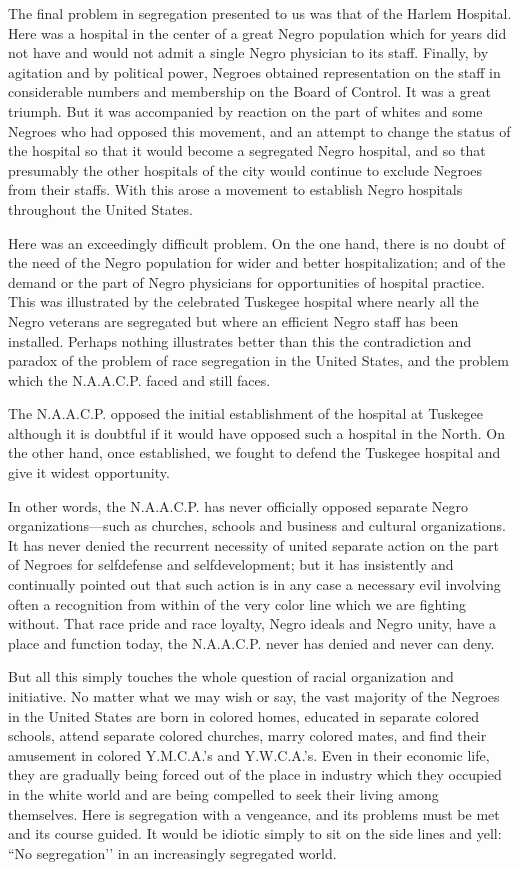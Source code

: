\documentclass[letterpaper,10pt,english]{jupyterBook}
\begin{document}
\sphinxAtStartPar
The final problem in segregation presented to us was that of the Harlem Hospital. Here was a hospital in the center of a great Negro population which for years did not have and would not admit a single Negro physician to its staff. Finally, by agitation and by political power, Negroes obtained representation on the staff in considerable numbers and membership on the Board of Control. It was a great triumph. But it was accompanied by reaction on the part of whites and some Negroes who had opposed this movement, and an attempt to change the status of the hospital so that it would become a segregated Negro hospital, and so that presumably the other hospitals of the city would continue to exclude Negroes from their staffs. With this arose a movement to establish Negro hospitals throughout the United States.

\sphinxAtStartPar
Here was an exceedingly difficult problem. On the one hand, there is no doubt of the need of the Negro population for wider and better hospitalization; and of the demand or the part of Negro physicians for opportunities of hospital practice. This was illustrated by the celebrated Tuskegee hospital where nearly all the Negro veterans are segregated but where an efficient Negro staff has been installed. Perhaps nothing illustrates better than this the contradiction and paradox of the problem of race segregation in the United States, and the problem which the N.A.A.C.P. faced and still faces.

\sphinxAtStartPar
The N.A.A.C.P. opposed the initial establishment of the hospital at Tuskegee although it is doubtful if it would have opposed such a hospital in the North. On the other hand, once established, we fought to defend the Tuskegee hospital and give it widest opportunity.

\sphinxAtStartPar
In other words, the N.A.A.C.P. has never officially opposed separate Negro organizations—such as churches, schools and business and cultural organizations. It has never denied the recurrent necessity of united separate action on the part of Negroes for self\sphinxhyphen{}defense and self\sphinxhyphen{}development; but it has insistently and continually pointed out that such action is in any case a necessary evil involving often a recognition from within of the very color line which we are fighting without. That race pride and race loyalty, Negro ideals and Negro unity, have a place and function today, the N.A.A.C.P. never has denied and never can deny.

\sphinxAtStartPar
But all this simply touches the whole question of racial organization and initiative. No matter what we may wish or say, the vast majority of the Negroes in the United States are born in colored homes, educated in separate colored schools, attend separate colored churches, marry colored mates, and find their amusement in colored Y.M.C.A.’s and Y.W.C.A.’s. Even in their economic life, they are gradually being forced out of the place in industry which they occupied in the white world and are being compelled to seek their living among themselves. Here is segregation with a vengeance, and its problems must be met and its course guided. It would be idiotic simply to sit on the side lines and yell: “No segregation’’ in an increasingly segregated world.
\end{document}
